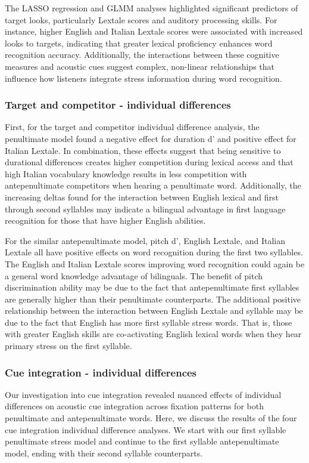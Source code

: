 The LASSO regression and GLMM analyses highlighted significant predictors of target looks, particularly Lextale scores and auditory processing skills. For instance, higher English and Italian Lextale scores were associated with increased looks to targets, indicating that greater lexical proficiency enhances word recognition accuracy. Additionally, the interactions between these cognitive measures and acoustic cues suggest complex, non-linear relationships that influence how listeners integrate stress information during word recognition.


\subsubsection{Target and competitor - individual differences}
First, for the target and competitor individual difference analysis, the penultimate model found a negative effect for duration d' and positive effect for Italian Lextale. In combination, these effects suggest that being sensitive to durational differences creates higher competition during lexical access and that high Italian vocabulary knowledge results in less competition with antepenultimate competitors when hearing a penultimate word. Additionally, the increasing deltas found for the interaction between English lexical and first through second syllables may indicate a bilingual advantage in first language recognition for those that have higher English abilities. 

For the similar antepenultimate model, pitch d', English Lextale, and Italian Lextale all have positive effects on word recognition during the first two syllables. The English and Italian Lextale scores improving word recognition could again be a general word knowledge advantage of bilinguals. The benefit of pitch discrimination ability may be due to the fact that antepenultimate first syllables are generally higher than their penultimate counterparts. The additional positive relationship between the interaction between English Lextale and syllable may be due to the fact that English has more first syllable stress words. That is, those with greater English skills are co-activating English lexical words when they hear primary stress on the first syllable.

\subsubsection{Cue integration - individual differences}
Our investigation into cue integration revealed nuanced effects of individual differences on acoustic cue integration across fixation patterns for both penultimate and antepenultimate words. Here, we discuss the results of the four cue integration individual difference analyses. We start with our first syllable penultimate stress model and continue to the first syllable antepenultimate model, ending with their second syllable counterparts.

